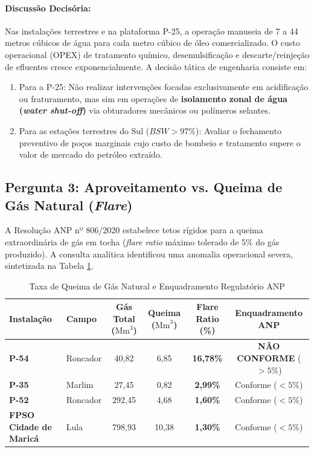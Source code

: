 \documentclass[12pt,a4paper]{article}
\begin{document}
\paragraph{Discussão Decisória:} Nas instalações terrestres e na plataforma P-25, a operação manuseia de 7 a 44 metros cúbicos de água para cada metro cúbico de óleo comercializado. O custo operacional (OPEX) de tratamento químico, desemulsificação e descarte/reinjeção de efluentes cresce exponencialmente. A decisão tática de engenharia consiste em:
\begin{enumerate}
    \item Para a P-25: Não realizar intervenções focadas exclusivamente em acidificação ou fraturamento, mas sim em operações de \textbf{isolamento zonal de água (\textit{water shut-off})} via obturadores mecânicos ou polímeros selantes.
    \item Para as estações terrestres do Sul ($BSW > 97\%$): Avaliar o fechamento preventivo de poços marginais cujo custo de bombeio e tratamento supere o valor de mercado do petróleo extraído.
\end{enumerate}

\subsection{Pergunta 3: Aproveitamento vs. Queima de Gás Natural (\textit{Flare})}
A Resolução ANP nº 806/2020 estabelece tetos rígidos para a queima extraordinária de gás em tocha (\textit{flare ratio} máximo tolerado de 5\% do gás produzido). A consulta analítica identificou uma anomalia operacional severa, sintetizada na Tabela \ref{tab:p3}.

\begin{table}[htbp]
\centering
\small
\caption{Taxa de Queima de Gás Natural e Enquadramento Regulatório ANP}
\label{tab:p3}
\begin{tabular}{llcccc}
\toprule
\textbf{Instalação} & \textbf{Campo} & \textbf{Gás Total ($\text{Mm}^3$)} & \textbf{Queima ($\text{Mm}^3$)} & \textbf{Flare Ratio (\%)} & \textbf{Enquadramento ANP} \\
\midrule
\textbf{P-54} & Roncador & 40,82 & 6,85 & \textbf{16,78\%} & \textbf{NÃO CONFORME} ($> 5\%$) \\
\textbf{P-35} & Marlim & 27,45 & 0,82 & \textbf{2,99\%} & Conforme ($< 5\%$) \\
\textbf{P-52} & Roncador & 292,45 & 4,68 & \textbf{1,60\%} & Conforme ($< 5\%$) \\
\textbf{FPSO Cidade de Maricá} & Lula & 798,93 & 10,38 & \textbf{1,30\%} & Conforme ($< 5\%$) \\
\bottomrule
\end{tabular}
\end{table}
\end{document}
